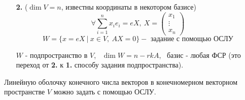 \begin{enumerate}
    \item[\textbf{2.}] ($\dim V = n$, известны координаты в некотором базисе)
    $$\forall \sum \limits_{i=1}^n x_ie_i = eX , \ X = \begin{pmatrix}
    x_1 \\ \vdots \\ x_n
    \end{pmatrix}$$
    $$W = \{x = eX \ | \ x \in V, \ AX = 0\} - \text{ задание с помощью ОСЛУ}$$
    \begin{subtheorem}
      $W$ - подпространство в $V$,  \ $\dim W = n - rkA$, \ базис - любая ФСР (это переход от \textbf{2.} к \textbf{1.} способу задания подпространства).
    \end{subtheorem} 
  \end{enumerate}
  \begin{theorem}
    Линейную оболочку конечного числа векторов в конечномерном векторном пространстве $V$ можно задать с помощью ОСЛУ.
  \end{theorem}
